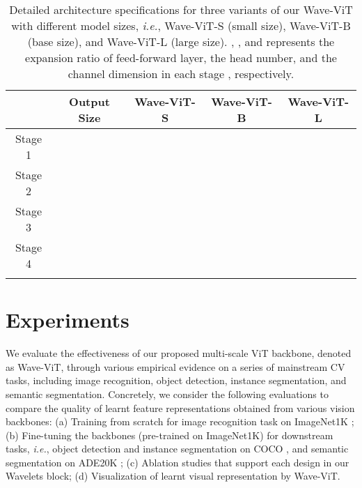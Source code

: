 \documentclass[runningheads]{llncs}
\begin{document}
\begin{table*}[!tb]\scriptsize
\centering
\caption{Detailed architecture specifications for three variants of our Wave-ViT with different model sizes, \emph{i.e.}, Wave-ViT-S (small size), Wave-ViT-B (base size), and Wave-ViT-L (large size). , , and  represents the expansion ratio of feed-forward layer, the head number, and the channel dimension in each stage , respectively.}
\vspace{-0.1in}
\begin{tabular}{c|c|c|c|c}
\Xhline{2\arrayrulewidth}
        & Output Size & Wave-ViT-S & Wave-ViT-B & Wave-ViT-L \\ \hline
Stage 1 & 
        & 
        & 
        & 
        \\ \hline
Stage 2 & 
        & 
        & 
        & 
        \\ \hline
Stage 3 & 
        & 
        & 
        & 
        \\ \hline
Stage 4 & 
        & 
        & 
        & 
        \\ \Xhline{2\arrayrulewidth}
\end{tabular}
\label{table:architecture}
\vspace{-0.2in}
\end{table*}

\section{Experiments}
We evaluate the effectiveness of our proposed multi-scale ViT backbone, denoted as Wave-ViT, through various empirical evidence on a series of mainstream CV tasks, including image recognition, object detection, instance segmentation, and semantic segmentation. Concretely, we consider the following evaluations to compare the quality of learnt feature representations obtained from various vision backbones: (a) Training from scratch for image recognition task on ImageNet1K \cite{deng2009imagenet}; (b) Fine-tuning the backbones (pre-trained on ImageNet1K) for downstream tasks, \emph{i.e.}, object detection and instance segmentation on COCO \cite{lin2014microsoft}, and semantic segmentation on ADE20K \cite{zhou2019semantic}; (c) Ablation studies that support each design in our Wavelets block; (d) Visualization of learnt visual representation by Wave-ViT.
\end{document}
